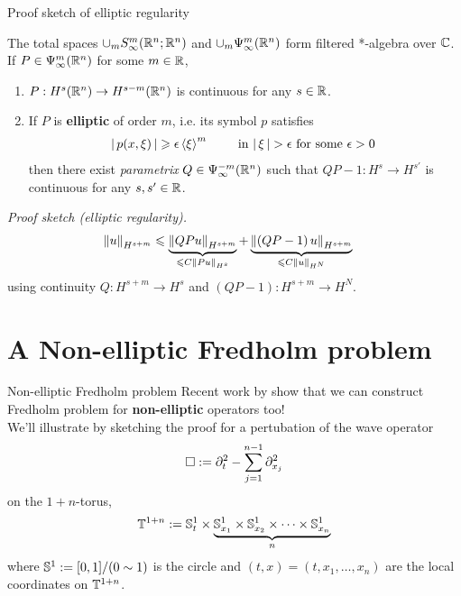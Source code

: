 \documentclass{beamer}
\begin{document}
\begin{frame}{Proof sketch of elliptic regularity}
\begin{theorem}
    The total spaces $\cup_{m} S^{m}_\infty(\R^{n}; \R^n)$ and $\cup_{m} \Psi^{m}_{\infty}(\R^n)$ form filtered *-algebra over $\C$. If $P \in \Psi^{m}_{\infty}(\R^n)$ for some $m \in \R$, 
    \begin{enumerate}
        \item $P : H^{s}(\R^n) \to H^{s - m}(\R^n)$ is continuous for any $s \in \R$. 
        \item If $P$ is \textbf{elliptic} of order $m$, i.e. its symbol $p$ satisfies
        \begin{align*}
        \abs{p(x, \xi)} \geq \epsilon \sym[\xi]^m \tag*{ in $\abs{\xi} > \epsilon$ for some $\epsilon > 0$ } 
        \end{align*}
        then there exist \textit{parametrix} $Q \in \Psi^{-m}_{\infty}(\R^n)$ such that $QP - 1: H^{s} \to H^{s'}$ is continuous for any $s, s' \in \R$. 
    \end{enumerate}
\end{theorem}
\textit{Proof sketch (elliptic regularity). } 
\begin{align*}
\norm[u]_{H^{s + m}} 
&\leq \underbrace{\norm[QPu]_{H^{s + m}}}_{\leq C \norm[Pu]_{H^s}} + \underbrace{\norm[\brac{QP - 1}u]_{H^{s +m}}}_{\leq C \norm[u]_{H^N}}
\end{align*}
using continuity $Q: H^{s +m} \to H^{s}$ and $(QP - 1): H^{s + m} \to H^{N}$.  

\end{frame} 



\section{A Non-elliptic Fredholm problem}

\begin{frame}{Non-elliptic Fredholm problem}
Recent work by \cite{Vasy, Gell-Redman} show that we can construct Fredholm problem for \textbf{non-elliptic} operators too! \\
We'll illustrate by sketching the proof for a pertubation of the  wave operator 
\begin{align*}
\Box := \p_t^2 - \sum_{j = 1}^{n -1} \p_{x_j}^2
\end{align*}
on the $1 + n$-torus, 
\begin{align*}
\T^{1 + n} := \S^1_t \times  \underbrace{\S^1_{x_1} \times \S^1_{x_2} \times \dots \times \S^1_{x_n}}_{n} 
\end{align*}
where $\S^1 := [0, 1] / (0 \sim 1)$ is the circle and $(t, x) = (t, x_1, \dots, x_n)$ are the local coordinates on $\T^{1 + n}$. 
\end{frame} 
\end{document}
